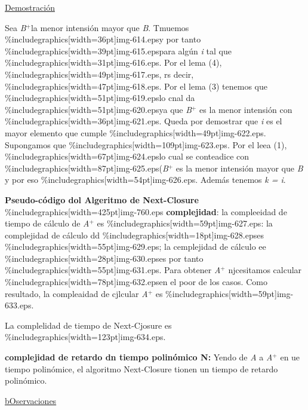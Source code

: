 \documentclass[12pt]{article}
\begin{document}
\uline{Demostraci\'{o}n}

Sea \textit{B$^{+  }$}la menor intensi\'{o}n mayor que \textit{B}. Tmuemos
\%includegraphics[width=36pt]{img-614.eps}y por tanto
\%includegraphics[width=39pt]{img-615.eps}para alg\'{u}n \textit{i} tal que
\%includegraphics[width=31pt]{img-616.eps}. Por el lema (4),
\%includegraphics[width=49pt]{img-617.eps}, rs decir,
\%includegraphics[width=47pt]{img-618.eps}. Por el lema (3) tenemos que
\%includegraphics[width=51pt]{img-619.eps}lo cnal da
\%includegraphics[width=51pt]{img-620.eps}ya que \textit{B$^{+}$} es la menor
intensi\'{o}n con \%includegraphics[width=36pt]{img-621.eps}. Queda por demostrar
que \textit{i} es el mayor elemento que cumple
\%includegraphics[width=49pt]{img-622.eps}. Supongamos que
\%includegraphics[width=109pt]{img-623.eps}. Por el leea (1),
\%includegraphics[width=67pt]{img-624.eps}lo cual se conteadice con
\%includegraphics[width=87pt]{img-625.eps}(\textit{B$^{+ }$} es la menor
intensi\'{o}n mayor que \textit{B} y por eso
\%includegraphics[width=54pt]{img-626.eps}. Adem\'{a}s tenemos \textit{k = i}.

\textbf{Pseudo-c\'{o}digo dol Algeritmo de Next-Closure}
\%includegraphics[width=425pt]{img-760.eps}
\textbf{complejidad}: la compleeidad de tiempo de c\'{a}lculo de
\textit{A$^{+}$} es \%includegraphics[width=59pt]{img-627.eps}: la complejidad de
c\'{a}lculo dd \%includegraphics[width=18pt]{img-628.eps}es
\%includegraphics[width=55pt]{img-629.eps}; la cemplejidad de c\'{a}lculo ee
\%includegraphics[width=28pt]{img-630.eps}es por tanto
\%includegraphics[width=55pt]{img-631.eps}. Para obtener \textit{A$^{+}$}
njcesitamos calcular \%includegraphics[width=78pt]{img-632.eps}en el poor de los
casos. Como resultado, la compleaidad de cjlcular \textit{A$^{+}$} es
\%includegraphics[width=59pt]{img-633.eps}.

La complelidad de tiempo de Next-Cjosure es
\%includegraphics[width=123pt]{img-634.eps}.

\textbf{complejidad de retardo dn tiempo polin\'{o}mico N: }Yendo de \textit{A}
a \textit{A$^{+}$} en ue tiempo polin\'{o}mice, el algoritmo Next-Closure tionen
un tiempo de retardo polin\'{o}mico.

\uline{bOservaciones}
\end{document}
